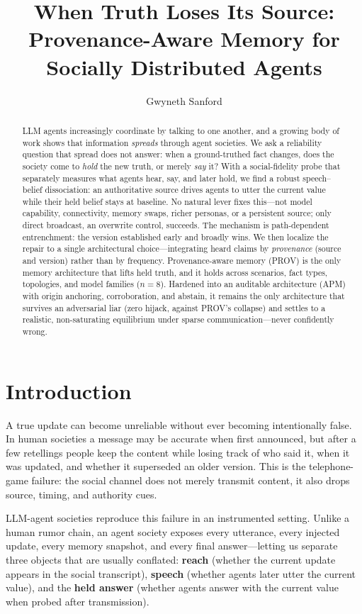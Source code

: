 \documentclass[letterpaper]{article} %
\title{When Truth Loses Its Source: Provenance-Aware Memory for Socially Distributed Agents}
\author{
    Gwyneth Sanford \\ %
}
\begin{document}
\maketitle

\begin{abstract}
LLM agents increasingly coordinate by talking to one another, and a growing body of work
shows that information \emph{spreads} through agent societies. We ask a reliability question
that spread does not answer: when a ground-truthed fact changes, does the society come to
\emph{hold} the new truth, or merely \emph{say} it? With a social-fidelity probe that
separately measures what agents hear, say, and later hold, we find a robust speech--belief
dissociation: an authoritative source drives agents to utter the current value while their
held belief stays at baseline. No natural lever fixes this---not model capability,
connectivity, memory swaps, richer personas, or a persistent source; only direct broadcast, an
overwrite control, succeeds. The mechanism is path-dependent entrenchment: the version
established early and broadly wins. We then localize the repair to a single architectural
choice---integrating heard claims by \emph{provenance} (source and version) rather than by
frequency. Provenance-aware memory (PROV) is the only memory architecture that lifts held
truth, and it holds across scenarios, fact types, topologies, and model families
($n{=}8$). Hardened into an auditable architecture (APM) with origin anchoring, corroboration,
and abstain, it remains the only architecture that survives an adversarial liar (zero hijack,
against PROV's collapse) and settles to a realistic, non-saturating equilibrium under sparse
communication---never confidently wrong.
\end{abstract}

\section{Introduction}
A true update can become unreliable without ever becoming intentionally false. In human
societies a message may be accurate when first announced, but after a few retellings people
keep the content while losing track of who said it, when it was updated, and whether it
superseded an older version. This is the telephone-game failure: the social channel does not
merely transmit content, it also drops source, timing, and authority cues.

LLM-agent societies reproduce this failure in an instrumented setting. Unlike a human rumor
chain, an agent society exposes every utterance, every injected update, every memory snapshot,
and every final answer---letting us separate three objects that are usually conflated:
\textbf{reach} (whether the current update appears in the social transcript), \textbf{speech}
(whether agents later utter the current value), and the \textbf{held answer} (whether agents
answer with the current value when probed after transmission).
\end{document}
